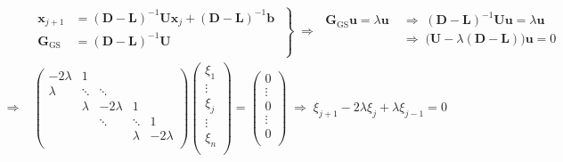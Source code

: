 \documentclass[12pt, UTF8, nofonts]{ctexart}
\begin{document}
\begin{equation}
  \label{eq:gsiter}
  \begin{aligned}
    & \left.\begin{aligned}
      \boldsymbol{x}_{j+1} &= (\boldsymbol{D} - \boldsymbol{L})^{-1} \boldsymbol{U} \boldsymbol{x}_{j} + (\boldsymbol{D} - \boldsymbol{L})^{-1} \boldsymbol{b} \\
      \boldsymbol{G}_{\mathrm{GS}} &= (\boldsymbol{D} - \boldsymbol{L})^{-1} \boldsymbol{U}  \\
    \end{aligned} \;\right\} \;\Rightarrow\;
    \begin{aligned}
      \boldsymbol{G}_{\mathrm{GS}}\boldsymbol{u} = \lambda\boldsymbol{u} &\;\Rightarrow\; (\boldsymbol{D}-\boldsymbol{L})^{-1}\boldsymbol{U} \boldsymbol{u} = \lambda \boldsymbol{u} \\
      &\;\Rightarrow\; \Big(\boldsymbol{U}-\lambda (\boldsymbol{D} - \boldsymbol{L})\Big)\boldsymbol{u} = 0 \\
    \end{aligned} \\
    \Rightarrow\;& \begin{pmatrix}
      -2\lambda & 1 &  &  &  \\
      \lambda & \ddots & \ddots & & \\
      & \lambda & -2\lambda & 1 & \\
      & & \ddots & \ddots & 1 \\
      & & & \lambda & -2\lambda \\
    \end{pmatrix}
    \begin{pmatrix}
      \xi_1 \\ \vdots \\ \xi_{j} \\ \vdots \\ \xi_{n} \\
    \end{pmatrix} =
    \begin{pmatrix}
      0 \\ \vdots \\ 0 \\ \vdots \\ 0 \\
    \end{pmatrix} \;\Rightarrow\;
    \xi_{j+1} - 2\lambda\xi_{j} + \lambda\xi_{j-1} = 0
  \end{aligned}
\end{equation}
\end{document}
